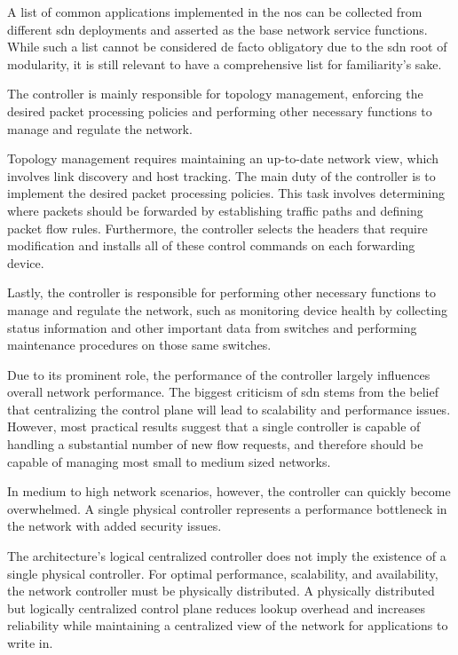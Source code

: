 A list of common applications implemented in the \gls{nos} can be collected from different \gls{sdn} deployments and asserted as the base network service functions\cite{kreutz_software-defined_2015}. While such a list cannot be considered de facto obligatory due to the \gls{sdn} root of modularity, it is still relevant to have a comprehensive list for familiarity's sake.

The controller is mainly responsible for topology management, enforcing the desired packet processing policies and performing other necessary functions to manage and regulate the network. \cite{peterson_software-defined_2021}\cite{latif_comprehensive_2020}\cite{bifulco_survey_2018}\cite{kreutz_software-defined_2015}\cite{zhu_sdn_2020}

Topology management requires maintaining an up-to-date network view, which involves link discovery and host tracking.
The main duty of the controller is to implement the desired packet processing policies. This task involves determining where packets should be forwarded by establishing traffic paths and defining packet flow rules. Furthermore, the controller selects the headers that require modification and installs all of these control commands on each forwarding device.

Lastly, the controller is responsible for performing other necessary functions to manage and regulate the network, such as monitoring device health by collecting status information and other important data from switches and performing maintenance procedures on those same switches.

Due to its prominent role, the performance of the controller largely influences overall network performance. The biggest criticism of \gls{sdn} stems from the belief that centralizing the control plane will lead to scalability and performance issues. However, most practical results suggest that a single controller is capable of handling a substantial number of new flow requests, and therefore should be capable of managing most small to medium sized networks\cite{nunes_survey_2014}\cite{zhu_sdn_2020}.

In medium to high network scenarios, however, the controller can quickly become overwhelmed. A single physical controller represents a performance bottleneck in the network with added security issues. \cite{zhu_sdn_2020}

The architecture's logical centralized controller does not imply the existence of a single physical controller. For optimal performance, scalability, and availability, the network controller must be physically distributed\cite{kreutz_software-defined_2015}. A physically distributed but logically centralized control plane reduces lookup overhead and increases reliability while maintaining a centralized view of the network for applications to write in\cite{nunes_survey_2014}. 

